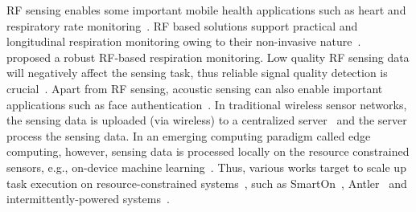 RF sensing enables some important mobile health applications such as heart and respiratory rate monitoring~\cite{zongxing2022uwb,zongxing2022measure}. 
RF based solutions support practical and longitudinal respiration monitoring owing to their non-invasive nature~\cite{zongxing2023rf,zongxing2021uwb}.
~\cite{zongxing2024rfq} proposed a robust RF-based respiration monitoring.
Low quality RF sensing data will negatively affect the sensing task, thus reliable signal quality detection is crucial~\cite{zongxing2021quality}.
Apart from RF sensing, acoustic sensing can also enable important applications such as face authentication~\cite{zongxing2019face,zongxing2022face}.
In traditional wireless sensor networks, the sensing data is uploaded (via wireless) to a centralized server~\cite{yubo2023blockchain} and the server process the sensing data.
In an emerging computing paradigm called edge computing, however, sensing data is processed locally on the resource constrained sensors, 
e.g., on-device machine learning~\cite{yubo2020ondevice,yubo2022demo,yubo2019ondevice}.
Thus, various works target to scale up task execution on resource-constrained systems~\cite{yubo_thesis}, such as 
SmartOn~\cite{yubo2021smarton}, Antler~\cite{yubo2023efficient} and intermittently-powered systems~\cite{yubo2023audio,yubo2023intermittent}.



  
  

  


